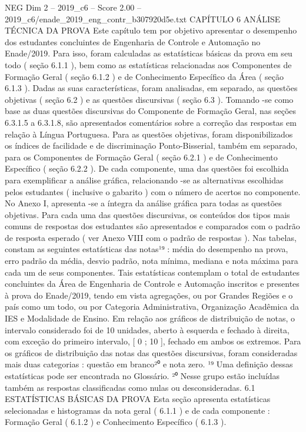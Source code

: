 \begin{textsample}{NEG Dim 2 – 2019\_c6 – Score 2.00 – 2019\_c6/enade\_2019\_eng\_contr\_b307920d5e.txt}  \label{ex:f2_neg_284}
CAPÍTULO 6 ANÁLISE TÉCNICA DA PROVA Este capítulo tem por objetivo apresentar o desempenho dos estudantes concluintes de Engenharia de Controle e Automação no Enade/2019.
Para isso, foram calculadas as estatísticas básicas da prova em seu todo ( seção 6.1.1 ), bem como as estatísticas relacionadas aos Componentes de Formação Geral ( seção 6.1.2 ) e de Conhecimento Específico da Área ( seção 6.1.3 ).
Dadas as suas características, foram analisadas, em separado, as questões objetivas ( seção 6.2 ) e as questões discursivas ( seção 6.3 ).
Tomando -se como base as duas questões discursivas do Componente de Formação Geral, nas seções 6.3.1.5 a 6.3.1.8, são apresentados comentários sobre a correção das respostas em relação à Língua Portuguesa.
Para as questões objetivas, foram disponibilizados os índices de facilidade e de discriminação Ponto-Bisserial, também em separado, para os Componentes de Formação Geral ( seção 6.2.1 ) e de Conhecimento Específico ( seção 6.2.2 ).
De cada componente, uma das questões foi escolhida para exemplificar a análise gráfica, relacionando -se as alternativas escolhidas pelos estudantes ( inclusive o gabarito ) com o número de acertos no componente.
No Anexo I, apresenta -se a íntegra da análise gráfica para todas as questões objetivas.
Para cada uma das questões discursivas, os conteúdos dos tipos mais comuns de respostas dos estudantes são apresentados e comparados com o padrão de resposta esperado ( ver Anexo VIII com o padrão de respostas ).
Nas tabelas, constam as seguintes estatísticas das notas¹⁹ : média do desempenho na prova, erro padrão da média, desvio padrão, nota mínima, mediana e nota máxima para cada um de seus componentes.
Tais estatísticas contemplam o total de estudantes concluintes da Área de Engenharia de Controle e Automação inscritos e presentes à prova do Enade/2019, tendo em vista agregações, ou por Grandes Regiões e o país como um todo, ou por Categoria Administrativa, Organização Acadêmica da IES e Modalidade de Ensino.
Em relação aos gráficos de distribuição de notas, o intervalo considerado foi de 10 unidades, aberto à esquerda e fechado à direita, com exceção do primeiro intervalo, [ 0 ; 10 ], fechado em ambos os extremos.
Para os gráficos de distribuição das notas das questões discursivas, foram consideradas mais duas categorias : questão em branco²⁰ e nota zero. ¹⁹ Uma definição dessas estatísticas pode ser encontrada no Glossário. ²⁰ Nesse grupo estão incluídas também as respostas classificadas como nulas ou desconsideradas. 6.1 ESTATÍSTICAS BÁSICAS DA PROVA Esta seção apresenta estatísticas selecionadas e histogramas da nota geral ( 6.1.1 ) e de cada componente : Formação Geral ( 6.1.2 ) e Conhecimento Específico ( 6.1.3 ).

\end{textsample}
